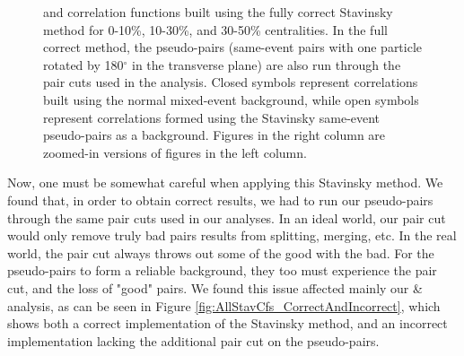\documentclass[../AnalysisNoteJBuxton.tex]{subfiles}
\begin{document}
\begin{figure}[h!]
  \caption[\LamK Stavinsky Correlation Functions (Correct)]{\LamK and \ALamAK correlation functions built using the fully correct Stavinsky method for 0-10\%, 10-30\%, and 30-50\% centralities.  In the full correct method, the pseudo-pairs (same-event pairs with one particle rotated by 180$^\circ$ in the transverse plane) are also run through the pair cuts used in the analysis.  Closed symbols represent correlations built using the normal mixed-event background, while open symbols represent correlations formed using the Stavinsky same-event pseudo-pairs as a background.  Figures in the right column are zoomed-in versions of figures in the left column.}
  \label{fig:AllStavCfs_Correct}
\end{figure}




Now, one must be somewhat careful when applying this Stavinsky method.  We found that, in order to obtain correct results, we had to run our pseudo-pairs through the same pair cuts used in our analyses.  In an ideal world, our pair cut would only remove truly bad pairs results from splitting, merging, etc.  In the real world, the pair cut always throws out some of the good with the bad.  For the pseudo-pairs to form a reliable background, they too must experience the pair cut, and the loss of "good" pairs.  We found this issue affected mainly our \LamKchP \& \ALamKchM analysis, as can be seen in Figure \ref{fig:AllStavCfs_CorrectAndIncorrect}, which shows both a correct implementation of the Stavinsky method, and an incorrect implementation lacking the additional pair cut on the pseudo-pairs.
\end{document}

